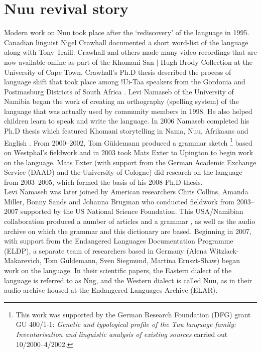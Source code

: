 \markboth{}{}
\addtocounter{section}{-1}
\tocless\section{N\textipa{\textvertline}uu revival story}
{}
\markboth{}{}

Modern work on N\textipa{\textvertline}uu took place after the
`rediscovery' of the language in 1995. Canadian linguist Nigel
Crawhall documented a short word-list of the language along with Tony
Traill. Crawhall and others made many video recordings that are now
available online as part of the \textipa{\textdoublebarpipe}Khomani
San $|$ Hugh Brody Collection at the University of Cape Town.
Crawhall's Ph.D thesis described the process of language shift that
took place among !Ui-Taa speakers from the Gordonia and Postmasburg
Districts of South Africa \parencite{Crawhall2004}.  Levi Namaseb of the
University of Namibia began the work of creating
an orthography (spelling system) of the language that was actually
used by community members in 1998. He also helped children learn to
speak and write the language.
In 2006 Namaseb completed his Ph.D thesis which featured
\textipa{\textdoublebarpipe}Khomani
storytelling in Nama, N\textipa{\textvertline}uu, Afrikaans and English
\parencite{Namaseb2006}.
 From 2000--2002, Tom G\"{u}ldemann
produced a grammar sketch
\parencite{Gueldemannforthcoming2003}\footnote{This work was supported
by the German Research Foundation (DFG) grant GU 400/1-1: \emph{Genetic
and typological profile of the Tuu language family: Inventarisation
and linguistic analysis of existing sources} carried out
10/2000--4/2002.} based on Westphal's fieldwork and in 2003 took Mats
Exter to Upington to begin work on the language. Mats Exter (with
support from the German Academic Exchange Service (DAAD) and the
University of Cologne) did research on the language from 2003--2005,
which formed the basis of his 2008 Ph.D thesis.\\

Levi Namaseb was later joined by American researchers Chris Collins,
Amanda Miller, Bonny Sands and Johanna Brugman who conducted fieldwork
from 2003--2007 supported by the US National Science Foundation. This
USA/Namibian collaboration produced a number of articles and a grammar
\parencite{Collins2011}, as well as the audio archive on which the
grammar and this dictionary are based.  Beginning in 2007, with
support from the Endangered Languages Documentation Programme (ELDP),
a separate team of researchers based in Germany (Alena
Witzlack-Makarevich, Tom G\"{u}ldemann, Sven Siegmund, Martina
Ernszt-Shaw) began work on the language. In their scientific papers,
the Eastern dialect of the language is referred to as
N\textipa{\textdoublevertline}ng, and the Western dialect is called
N\textipa{\textvertline}uu, as in their audio archive housed at the
Endangered Languages Archive (ELAR).\\


